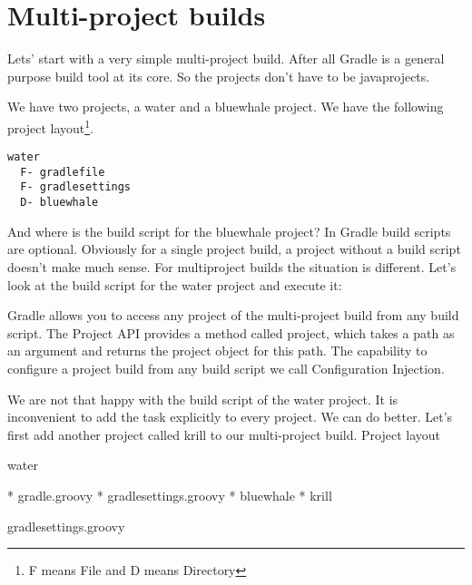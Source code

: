 \chapter{Multi-project builds} %
\label{cha:multi_project_builds}
Lets' start with a very simple multi-project build. After all Gradle is a general purpose build tool at its core. So the projects don't have to be javaprojects. 

We have two projects, a water and a bluewhale project. We have the following project layout\footnote{F means File and D means Directory}. 

\begin{minipage}[t]{7cm}
\begin{Verbatim}[frame=single,label=Project Layout]
water
  F- gradlefile
  F- gradlesettings
  D- bluewhale	
\end{Verbatim}
\end{minipage}	
\begin{minipage}[t]{7cm}
\end{minipage}
And where is the build script for the bluewhale project? In Gradle build scripts are optional. Obviously for a single project build, a project without a build script doesn't make much sense. For multiproject builds the situation is different. Let's look at the build script for the water project and execute it:

Gradle allows you to access any project of the multi-project build from any build script. The Project API provides a method called project, which takes a path as an argument and returns the project object for this path. The capability to configure a project build from any build script we call Configuration Injection.

We are not that happy with the build script of the water project. It is inconvenient to add the task explicitly to every project. We can do better. Let's first add another project called krill to our multi-project build.
Project layout

water

    * gradle.groovy
    * gradlesettings.groovy
    * bluewhale
    * krill

	
gradlesettings.groovy

